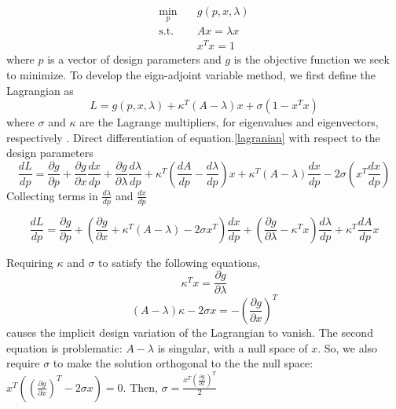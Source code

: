 \documentclass{tufte-handout}
\begin{document}
\begin{equation}\label{opt_problem}
\begin{aligned}
\min_{p} \quad & g(p,x,\lambda) \\
\textrm{s.t.} \quad &  A x = \lambda x \\ & 
  x^T x = 1
\end{aligned}
\end{equation}
where $p$ is a vector of design parameters and $g$ is the objective function we seek to minimize. To develop the eign-adjoint variable method, we first define the Lagrangian  as
\begin{equation}\label{lagranian}
L=  g(p,x,\lambda) + \kappa^T(A- \lambda)x + \sigma (1-x^T x) 
\end{equation} 
 where $\sigma$ and  $\kappa$  are the Lagrange multipliers, for eigenvalues and eigenvectors, respectively .  Direct differentiation of equation.\ref{lagranian} with respect to the design parameters 
 \begin{equation}
 \frac{d L}{d p} = \frac{\partial g}{\partial p} + \frac{\partial g}{\partial x} \frac{d x}{d p}+ \frac{\partial g}{\partial \lambda} \frac{d \lambda}{d p} + \kappa^T \left( \frac{d A}{d p}- \frac{d \lambda}{d p}\right)  x + \kappa^T \left( A- \lambda \right) \frac{d x}{d p } -2  \sigma \left( x^T \frac{d x}{d p } \right)  
 \end{equation}
 Collecting terms in $\frac{d \lambda}{d p }$ and $\frac{d x }{d p}$ 
 
  \begin{equation}
  \frac{d L}{d p} = \frac{\partial g}{\partial p} + \left(  \frac{\partial g}{\partial x} + \kappa^T (A-\lambda) -2 \sigma x^T \right)  \frac{d x}{d p}+ \left(   \frac{\partial g}{\partial \lambda}- \kappa^T x  \right)  \frac{d \lambda}{d p} + \kappa^T  \frac{d A}{d p}  x  
  \end{equation}
  
  Requiring $\kappa$ and $\sigma$ to satisfy the following equations,  
  \begin{equation} \label{90}
 \kappa^T x   =  \frac{\partial g}{\partial \lambda}
  \end{equation}
  \begin{equation}\label{11}
  (A-\lambda) \kappa -2 \sigma x   = -\left(  \frac{\partial g}{\partial x} \right) ^T
  \end{equation}
causes the  implicit design variation of the
Lagrangian to vanish. The second equation is problematic: $A - \lambda$ is singular, with a null space of $x$. So, we  also require $\sigma$  to make the solution orthogonal to the  the null space:
$x^T \left( \left(  \frac{\partial g}{\partial x} \right) ^T -2 \sigma x \right)  = 0  $. Then, $\sigma = \frac{x^T \left( \frac{\partial g}{\partial x} \right)^T }{2}$
\end{document}
